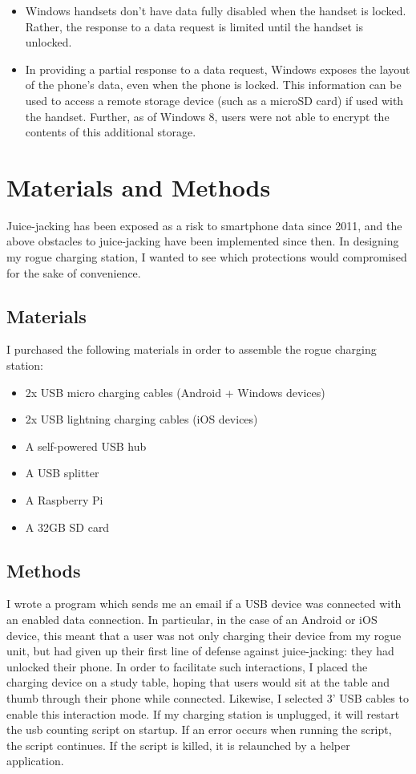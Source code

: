 \documentclass[11pt]{article} %
\begin{document}
\begin{itemize}
\item Windows handsets don't have data fully disabled when the handset is locked. Rather, the response to a data request is limited until the handset is unlocked. 

\item In providing a partial response to a data request, Windows exposes the layout of the phone's data, even when the phone is locked. This information can be used to access a remote storage device (such as a microSD card) if used with the handset. Further, as of Windows 8, users were not able to encrypt the contents of this additional storage. 
\end{itemize} 

\section{Materials and Methods}

Juice-jacking has been exposed as a risk to smartphone data since 2011, and the above obstacles to juice-jacking have been implemented since then. In designing my rogue charging station, I wanted to see which protections would compromised for the sake of  convenience.  

\subsection{Materials} 

I purchased the following materials in order to assemble the rogue charging station: 
\begin{itemize}
\item 2x USB micro charging cables (Android + Windows devices) 
\item 2x USB lightning charging cables (iOS devices) 
\item A self-powered USB hub
\item A USB splitter
\item A Raspberry Pi
\item A 32GB SD card
\end{itemize} 

\subsection{Methods} 

I wrote a program which sends me an email if a USB device was connected with an enabled data connection. In particular, in the case of an Android or iOS device, this meant that a user was not only charging their device from my rogue unit, but had given up their first line of defense against juice-jacking: they had unlocked their phone. In order to facilitate such interactions, I placed the charging device on a study table, hoping that users would sit at the table and thumb through their phone while connected. Likewise, I selected 3' USB cables to enable this interaction mode. If my charging station is unplugged, it will restart the usb counting script on startup. If an error occurs when running the script, the script continues. If the script is killed, it is relaunched by a helper application.\\
\end{document}

